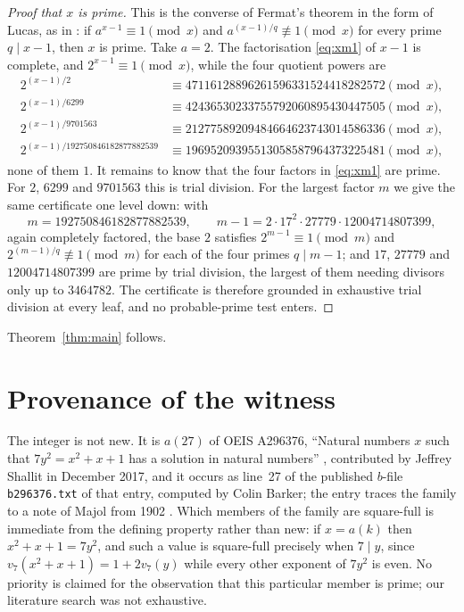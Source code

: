 \documentclass[11pt]{amsart}
\theoremstyle{remark}
\newcommand{\vp}{v}
\begin{document}
\begin{proof}[Proof that $x$ is prime]
This is the converse of Fermat's theorem in the form of Lucas, as in
\cite[Theorem~1]{BLS}: if $a^{x-1}\equiv1\pmod x$ and
$a^{(x-1)/q}\not\equiv1\pmod x$ for every prime $q\mid x-1$, then $x$ is prime.
Take $a=2$. The factorisation \eqref{eq:xm1} of $x-1$ is complete, and
$2^{x-1}\equiv1\pmod x$, while the four quotient powers are
{\small
\begin{align*}
 2^{(x-1)/2}          &\equiv 47116128896261596331524418282572 \pmod x,\\
 2^{(x-1)/6299}       &\equiv 42436530233755792060895430447505 \pmod x,\\
 2^{(x-1)/9701563}    &\equiv 21277589209484664623743014586336 \pmod x,\\
 2^{(x-1)/192750846182877882539}
                      &\equiv 19695209395513058587964373225481 \pmod x,
\end{align*}}
none of them $1$. It remains to know that the four factors in \eqref{eq:xm1} are
prime. For $2$, $6299$ and $9701563$ this is trial division. For the largest
factor $m$ we give the same certificate one level down: with
\[
 m=192750846182877882539,\qquad m-1=2\cdot 17^2\cdot 27779\cdot 12004714807399,
\]
again completely factored, the base $2$ satisfies $2^{m-1}\equiv1\pmod m$ and
$2^{(m-1)/q}\not\equiv1\pmod m$ for each of the four primes
$q\mid m-1$; and $17$, $27779$ and $12004714807399$ are
prime by trial division, the largest of them needing divisors only up to
$3464782$. The certificate is therefore grounded in exhaustive trial division at
every leaf, and no probable-prime test enters.
\end{proof}

Theorem~\ref{thm:main} follows.

\section{Provenance of the witness}

The integer is not new. It is $a(27)$ of OEIS A296376, ``Natural numbers $x$
such that $7y^2=x^2+x+1$ has a solution in natural numbers'' \cite{A296376},
contributed by Jeffrey Shallit in December 2017, and it occurs as line~27 of the
published $b$-file \texttt{b296376.txt} of that entry, computed by Colin Barker;
the entry traces the family to a note of Majol from 1902 \cite{Majol}. Which
members of the family are square-full is immediate from the defining property
rather than new: if $x=a(k)$ then $x^2+x+1=7y^2$, and such a value is
square-full precisely when $7\mid y$, since $\vp_7(x^2+x+1)=1+2\vp_7(y)$ while
every other exponent of $7y^2$ is even. No priority is claimed for the
observation that this particular member is prime; our literature search was not
exhaustive.
\end{document}
